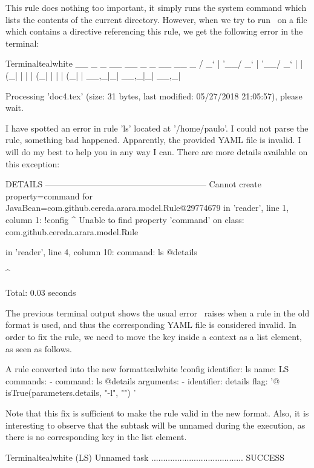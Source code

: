 This rule does nothing too important, it simply runs the system command  which lists the contents of the current directory. However, when we try to run \arara\ on a file which contains a directive referencing this rule, we get the following error in the terminal:

\begin{codebox}{Terminal}{teal}{\icnote}{white}
  __ _ _ __ __ _ _ __ __ _ 
 / _` | '__/ _` | '__/ _` |
| (_| | | | (_| | | | (_| |
 \__,_|_|  \__,_|_|  \__,_|

Processing 'doc4.tex' (size: 31 bytes, last modified: 05/27/2018
21:05:57), please wait.

I have spotted an error in rule 'ls' located at '/home/paulo'. I
could not parse the rule, something bad happened. Apparently, the
provided YAML file is invalid. I will do my best to help you in
any way I can. There are more details available on this
exception:

DETAILS ---------------------------------------------------------
Cannot create property=command for
JavaBean=com.github.cereda.arara.model.Rule@29774679
 in
'reader', line 1, column 1:
    !config
    ^
Unable to find
property 'command' on class: com.github.cereda.arara.model.Rule

in 'reader', line 4, column 10:
    command: ls @{details}
      
      ^


Total: 0.03 seconds
\end{codebox}

The previous terminal output shows the usual error \arara\ raises when a rule in the old format is used, and thus the corresponding YAML file is considered invalid. In order to fix the rule, we need to move the  key inside a  context as a list element, as seen as follows.

\begin{codebox}{A rule converted into the new format}{teal}{\icnote}{white}
!config
identifier: ls
name: LS
commands:
- command: ls @{details}
arguments:
- identifier: details
  flag: '@{ isTrue(parameters.details, "-l", "") }'
\end{codebox}

Note that this fix is sufficient to make the rule valid in the new format. Also, it is interesting to observe that the subtask will be unnamed during the execution, as there is no corresponding  key  in the list element.

\begin{codebox}{Terminal}{teal}{\icnote}{white}
(LS) Unnamed task ....................................... SUCCESS
\end{codebox}

